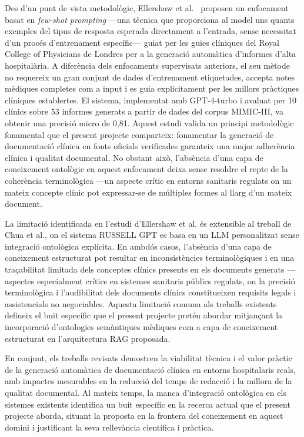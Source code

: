 \documentclass[11pt,a4paper]{article}
\begin{document}
Des d'un punt de vista metodològic, Ellershaw et al.~\cite{ellershaw2024discharge} proposen un enfocament basat en \textit{few-shot prompting} ---una tècnica que proporciona al model uns quants exemples del tipus de resposta esperada directament a l'entrada, sense necessitat d'un procés d'entrenament específic--- guiat per les guies clíniques del Royal College of Physicians de Londres per a la generació automàtica d'informes d'alta hospitalària. A diferència dels enfocaments supervisats anteriors, el seu mètode no requereix un gran conjunt de dades d'entrenament etiquetades, accepta notes mèdiques completes com a input i es guia explícitament per les millors pràctiques clíniques establertes. El sistema, implementat amb GPT-4-turbo i avaluat per 10 clínics sobre 53 informes generats a partir de dades del corpus MIMIC-III, va obtenir una precisió micro de 0,81. Aquest estudi valida un principi metodològic fonamental que el present projecte comparteix: fonamentar la generació de documentació clínica en fonts oficials verificades garanteix una major adherència clínica i qualitat documental. No obstant això, l'absència d'una capa de coneixement ontològic en aquest enfocament deixa sense resoldre el repte de la coherència terminològica ---un aspecte crític en entorns sanitaris regulats on un mateix concepte clínic pot expressar-se de múltiples formes al llarg d'un mateix document.

La limitació identificada en l'estudi d'Ellershaw et al. és extensible al treball de Chua et al., on el sistema RUSSELL GPT es basa en un LLM personalitzat sense integració ontològica explícita. En ambdós casos, l'absència d'una capa de coneixement estructurat pot resultar en inconsistències terminològiques i en una traçabilitat limitada dels conceptes clínics presents en els documents generats ---aspectes especialment crítics en sistemes sanitaris públics regulats, on la precisió terminològica i l'audibilitat dels documents clínics constitueixen requisits legals i assistencials no negociables. Aquesta limitació comuna als treballs existents defineix el buit específic que el present projecte pretén abordar mitjançant la incorporació d'ontologies semàntiques mèdiques com a capa de coneixement estructurat en l'arquitectura RAG proposada.

En conjunt, els treballs revisats demostren la viabilitat tècnica i el valor pràctic de la generació automàtica de documentació clínica en entorns hospitalaris reals, amb impactes mesurables en la reducció del temps de redacció i la millora de la qualitat documental. Al mateix temps, la manca d'integració ontològica en els sistemes existents identifica un buit específic en la recerca actual que el present projecte aborda, situant la proposta en la frontera del coneixement en aquest domini i justificant la seva rellevància científica i pràctica.
\end{document}
